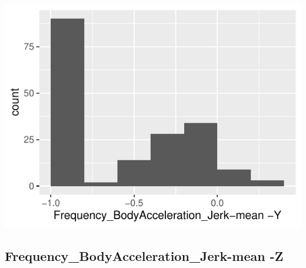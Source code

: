 \documentclass[
]{article}
\begin{document}
\begin{minipage}{0.25 \textwidth}

\includegraphics{codebook_tidydatasub_files/figure-latex/Var-53-Frequency-BodyAcceleration-Jerk-mean--Y-1.pdf}

\end{minipage}

\noindent\makebox[\linewidth]{\rule{\textwidth}{0.4pt}}

\hypertarget{frequency_bodyacceleration_jerk-mean--z}{%
\subsection{Frequency\_BodyAcceleration\_Jerk-mean
-Z}\label{frequency_bodyacceleration_jerk-mean--z}}
\end{document}
